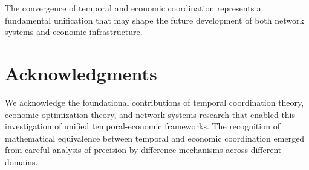 \documentclass[12pt,a4paper]{article}
\begin{document}
The convergence of temporal and economic coordination represents a fundamental unification that may shape the future development of both network systems and economic infrastructure.

\section*{Acknowledgments}

We acknowledge the foundational contributions of temporal coordination theory, economic optimization theory, and network systems research that enabled this investigation of unified temporal-economic frameworks. The recognition of mathematical equivalence between temporal and economic coordination emerged from careful analysis of precision-by-difference mechanisms across different domains.


\end{document}
